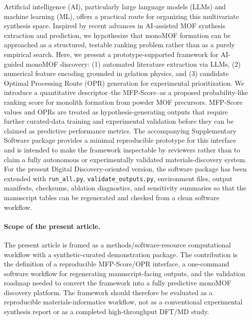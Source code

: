 \documentclass[12pt,a4paper]{article}
\begin{document}
Artificial intelligence (AI), particularly large language models (LLMs) and machine learning (ML), offers a practical route for organizing this multivariate synthesis space. Inspired by recent advances in AI-assisted MOF synthesis extraction and prediction,\cite{ref3,ref10,ref16} we hypothesize that monoMOF formation can be approached as a structured, testable ranking problem rather than as a purely empirical search. Here, we present a prototype-supported framework for AI-guided monoMOF discovery: (1) automated literature extraction via LLMs, (2) numerical feature encoding grounded in gelation physics, and (3) candidate Optimal Processing Route (OPR) generation for experimental prioritization. We introduce a quantitative descriptor--the MFP-Score--as a proposed probability-like ranking score for monolith formation from powder MOF precursors. MFP-Score values and OPRs are treated as hypothesis-generating outputs that require further curated-data training and experimental validation before they can be claimed as predictive performance metrics. The accompanying Supplementary Software package provides a minimal reproducible prototype for this interface and is intended to make the framework inspectable by reviewers rather than to claim a fully autonomous or experimentally validated materials-discovery system. For the present Digital Discovery-oriented version, the software package has been extended with \texttt{run\_all.py}, \texttt{validate\_outputs.py}, environment files, output manifests, checksums, ablation diagnostics, and sensitivity summaries so that the manuscript tables can be regenerated and checked from a clean software workflow.

\paragraph{Scope of the present article.} The present article is framed as a methods/software-resource computational workflow with a synthetic-curated demonstration package. The contribution is the definition of a reproducible MFP-Score/OPR interface, a one-command software workflow for regenerating manuscript-facing outputs, and the validation roadmap needed to convert the framework into a fully predictive monoMOF discovery platform. The framework should therefore be evaluated as a reproducible materials-informatics workflow, not as a conventional experimental synthesis report or as a completed high-throughput DFT/MD study.
\end{document}
